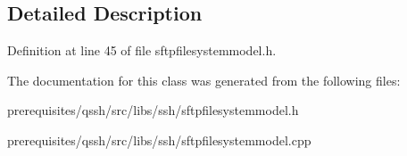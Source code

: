 \subsection{Detailed Description}


Definition at line 45 of file sftpfilesystemmodel.\+h.



The documentation for this class was generated from the following files\+:\begin{DoxyCompactItemize}
\item 
prerequisites/qssh/src/libs/ssh/sftpfilesystemmodel.\+h\item 
prerequisites/qssh/src/libs/ssh/sftpfilesystemmodel.\+cpp\end{DoxyCompactItemize}
